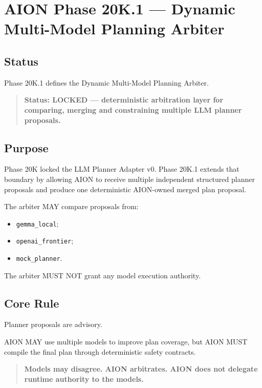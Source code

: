 \section{AION Phase 20K.1 --- Dynamic Multi-Model Planning Arbiter}
\label{sec:aion-phase20k1-multi-model-planning-arbiter}

\subsection{Status}

Phase 20K.1 defines the Dynamic Multi-Model Planning Arbiter.

\begin{quote}
\textbf{Status: LOCKED --- deterministic arbitration layer for comparing, merging and constraining multiple LLM planner proposals.}
\end{quote}

\subsection{Purpose}

Phase 20K locked the LLM Planner Adapter v0. Phase 20K.1 extends that boundary by allowing AION to receive multiple independent structured planner proposals and produce one deterministic AION-owned merged plan proposal.

The arbiter MAY compare proposals from:

\begin{itemize}
  \item \texttt{gemma\_local};
  \item \texttt{openai\_frontier};
  \item \texttt{mock\_planner}.
\end{itemize}

The arbiter MUST NOT grant any model execution authority.

\subsection{Core Rule}

Planner proposals are advisory.

AION MAY use multiple models to improve plan coverage, but AION MUST compile the final plan through deterministic safety contracts.

\begin{quote}
\textbf{Models may disagree. AION arbitrates. AION does not delegate runtime authority to the models.}
\end{quote}

